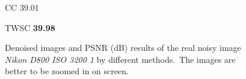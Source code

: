 \begin{figure}[t!]
{\begin{minipage}[t]{0.19\textwidth}
{\footnotesize CC 39.01}
\end{minipage}
\begin{minipage}[t]{0.19\textwidth}
\centering
{}
{\footnotesize TWSC \textbf{39.98}}
\end{minipage}
}\vspace{-3mm}
    \caption{Denoised images and PSNR (dB) results of the real noisy image \textsl{Nikon D800 ISO 3200 1} \cite{crosschannel2016} by different methods.\ The images are better to be zoomed in on screen.}
    \label{fig5-14}
\end{figure}



